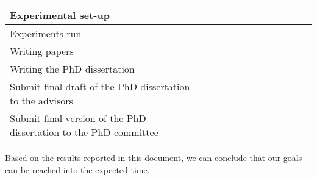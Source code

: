 \documentclass[authoryear,11pt]{elsarticle}
\begin{document}
\begin{table}[h!]
\begin{tabular}{|p{7cm}|c|c|c|c|c|c|c|c|c|c|c|c|}
		\hline
		Experimental set-up &\cellcolor{blue}&\cellcolor{blue}&&\cellcolor{blue}&
		\cellcolor{blue}&&\cellcolor{blue}&\cellcolor{blue}&&&&\\
		\hline
		Experiments run &&&\cellcolor{blue}&\cellcolor{blue}&&\cellcolor{blue}&\cellcolor{blue}&&
		\cellcolor{blue}&&&\\
		\hline
		Writing papers &\cellcolor{blue}&&\cellcolor{blue}&&\cellcolor{blue}&\cellcolor{blue}&&&
		\cellcolor{blue}&&&\\
		\hline
		Writing the PhD dissertation &&&&\cellcolor{blue}&\cellcolor{blue}&\cellcolor{blue}&
		\cellcolor{blue}&\cellcolor{blue}&\cellcolor{blue}&&&\\
		\hline
		Submit final draft of the PhD dissertation to the advisors &&&&&&&&&&\cellcolor[gray]{0.9}&&\\
		\hline
		Submit final version of the PhD dissertation to the PhD committee &&&&&&&&&&&\cellcolor[gray]{0.9}&\\
		\hline
		
 	\end{tabular}             
 \end{table}
 
   Based on the results reported in this document, we can conclude that our goals can be reached into the expected time.
	  	


	

{}

\end{document}
